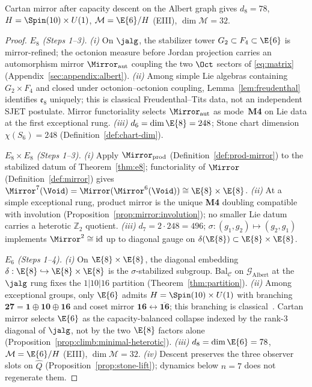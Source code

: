 \begin{theorem}[$\Mirror^8(\Void)=\E{6}$]\label{thm:e6}
Cartan mirror after capacity descent on the Albert graph gives $d_8=78$,
$H=\Spin(10)\times U(1)$, $\mathcal{M}=\E{6}/H$ (EIII), $\dim\mathcal{M}=32$.
\end{theorem}

\begin{proof}
\emph{$E_8$ (Steps 1--3).}
\emph{(i)} On $\jalg$, the stabilizer tower $G_2\subset F_4\subset\E{6}$ is
mirror-refined; the octonion measure before Jordan projection carries an
automorphism mirror $\Mirror_{\mathrm{aut}}$ coupling the two $\Oct$ sectors of
\eqref{eq:matrix} (Appendix~\ref{sec:appendix:albert}).
\emph{(ii)} Among simple Lie algebras containing $G_2\times F_4$ and closed
under octonion--octonion coupling, Lemma~\ref{lem:freudenthal} identifies
$\mathfrak{e}_8$ uniquely; this is classical Freudenthal--Tits data, not an
independent SJET postulate. Mirror functoriality selects
$\Mirror_{\mathrm{aut}}$ as mode~\textbf{M4} on Lie data at the first
exceptional rung.
\emph{(iii)} $d_6=\dim\E{8}=248$; Stone chart dimension $\chi(S_6)=248$
(Definition~\ref{def:chart-dim}).

\emph{$E_8\times E_8$ (Steps 1--3).}
\emph{(i)} Apply $\Mirror_{\mathrm{prod}}$ (Definition~\ref{def:prod-mirror})
to the stabilized datum of Theorem~\ref{thm:e8}; functoriality of $\Mirror$
(Definition~\ref{def:mirror}) gives
$\Mirror^7(\Void)=\Mirror(\Mirror^6(\Void))\cong\E{8}\times\E{8}$.
\emph{(ii)} At a simple exceptional rung, product mirror is the unique
\textbf{M4} doubling compatible with involution
(Proposition~\ref{prop:mirror:involution}); no smaller Lie datum carries a
heterotic $\mathbb{Z}_2$ quotient.
\emph{(iii)} $d_7=2\cdot248=496$; $\sigma:(g_1,g_2)\mapsto(g_2,g_1)$
implements $\Mirror^2\cong\mathrm{id}$ up to diagonal gauge on
$\delta(\E{8})\subset\E{8}\times\E{8}$.

\emph{$E_6$ (Steps 1--4).}
\emph{(i)} On $\E{8}\times\E{8}$, the diagonal embedding
$\delta:\E{8}\hookrightarrow\E{8}\times\E{8}$ is the $\sigma$-stabilized
subgroup. $\mathrm{Bal}_{\mathcal{C}}$ on $\mathcal{G}_{\mathrm{Albert}}$ at
the $\jalg$ rung fixes the $1|10|16$ partition
(Theorem~\ref{thm:partition}).
\emph{(ii)} Among exceptional groups, only $\E{6}$ admits
$H=\Spin(10)\times U(1)$ with branching
$\mathbf{27}=\mathbf{1}\oplus\mathbf{10}\oplus\mathbf{16}$ and coset mirror
$\mathbf{16}\leftrightarrow\overline{\mathbf{16}}$; this branching is
classical~\cite{SpringerVeldkamp2000}. Cartan mirror selects $\E{6}$ as the
capacity-balanced collapse indexed by the rank-$3$ diagonal of $\jalg$, not by
the two $\E{8}$ factors alone (Proposition~\ref{prop:climb:minimal-heterotic}).
\emph{(iii)} $d_8=\dim\E{6}=78$, $\mathcal{M}=\E{6}/H$ (EIII),
$\dim\mathcal{M}=32$.
\emph{(iv)} Descent preserves the three observer slots on $\hat Q$
(Proposition~\ref{prop:stone-lift}); dynamics below $n=7$ does not regenerate
them.
\end{proof}

